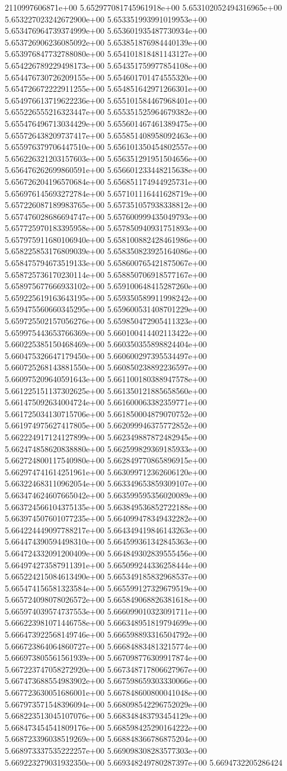2110997606871e+00	5.652977081745961918e+00	5.653102052494316965e+00	5.653227023242672900e+00	5.653351993991019953e+00	5.653476964739374999e+00	5.653601935487730934e+00	5.653726906236085092e+00	5.653851876984440139e+00	5.653976847732788080e+00	5.654101818481143127e+00	5.654226789229498173e+00	5.654351759977854108e+00	5.654476730726209155e+00	5.654601701474555320e+00	5.654726672222911255e+00	5.654851642971266301e+00	5.654976613719622236e+00	5.655101584467968401e+00	5.655226555216323447e+00	5.655351525964679382e+00	5.655476496713034429e+00	5.655601467461389475e+00	5.655726438209737417e+00	5.655851408958092463e+00	5.655976379706447510e+00	5.656101350454802557e+00	5.656226321203157603e+00	5.656351291951504656e+00	5.656476262699860591e+00	5.656601233448215638e+00	5.656726204196570684e+00	5.656851174944925731e+00	5.656976145693272784e+00	5.657101116441628719e+00	5.657226087189983765e+00	5.657351057938338812e+00	5.657476028686694747e+00	5.657600999435049793e+00	5.657725970183395958e+00	5.657850940931751893e+00	5.657975911680106940e+00	5.658100882428461986e+00	5.658225853176809039e+00	5.658350823925164086e+00	5.658475794673519133e+00	5.658600765421875067e+00	5.658725736170230114e+00	5.658850706918577167e+00	5.658975677666933102e+00	5.659100648415287260e+00	5.659225619163643195e+00	5.659350589911998242e+00	5.659475560660345295e+00	5.659600531408701229e+00	5.659725502157056276e+00	5.659850472905411323e+00	5.659975443653766369e+00	5.660100414402113422e+00	5.660225385150468469e+00	5.660350355898824404e+00	5.660475326647179450e+00	5.660600297395534497e+00	5.660725268143881550e+00	5.660850238892236597e+00	5.660975209640591643e+00	5.661100180388947578e+00	5.661225151137302625e+00	5.661350121885658560e+00	5.661475092634004724e+00	5.661600063382359771e+00	5.661725034130715706e+00	5.661850004879070752e+00	5.661974975627417805e+00	5.662099946375772852e+00	5.662224917124127899e+00	5.662349887872482945e+00	5.662474858620838880e+00	5.662599829369185933e+00	5.662724800117540980e+00	5.662849770865896915e+00	5.662974741614251961e+00	5.663099712362606120e+00	5.663224683110962054e+00	5.663349653859309107e+00	5.663474624607665042e+00	5.663599595356020089e+00	5.663724566104375135e+00	5.663849536852722188e+00	5.663974507601077235e+00	5.664099478349432282e+00	5.664224449097788217e+00	5.664349419846143263e+00	5.664474390594498310e+00	5.664599361342845363e+00	5.664724332091200409e+00	5.664849302839555456e+00	5.664974273587911391e+00	5.665099244336258444e+00	5.665224215084613490e+00	5.665349185832968537e+00	5.665474156581323584e+00	5.665599127329679519e+00	5.665724098078026572e+00	5.665849068826381618e+00	5.665974039574737553e+00	5.666099010323091711e+00	5.666223981071446758e+00	5.666348951819794699e+00	5.666473922568149746e+00	5.666598893316504792e+00	5.666723864064860727e+00	5.666848834813215774e+00	5.666973805561561939e+00	5.667098776309917874e+00	5.667223747058272920e+00	5.667348717806627967e+00	5.667473688554983902e+00	5.667598659303330066e+00	5.667723630051686001e+00	5.667848600800041048e+00	5.667973571548396094e+00	5.668098542296752029e+00	5.668223513045107076e+00	5.668348483793454129e+00	5.668473454541809176e+00	5.668598425290164222e+00	5.668723396038519269e+00	5.668848366786875204e+00	5.668973337535222257e+00	5.669098308283577303e+00	5.669223279031932350e+00	5.669348249780287397e+00	5.6694732205286424